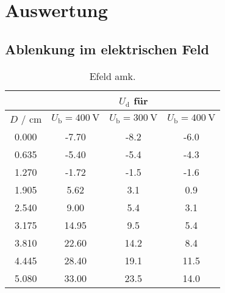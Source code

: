 \section{Auswertung}
\label{sec:Auswertung}

\subsection{Ablenkung im elektrischen Feld}

\begin{table}
	\caption{Efeld amk.}
	\label{tab:efeldtab}
	\centering
	\begin{tabular}{cccc}
	\toprule
		& & $U_{\mathrm{d}}$ für & \\
		\midrule
		$D$ / \si{\centi\meter} & $U_{\mathrm{b}}=\SI{400}{\volt}$ & $U_{\mathrm{b}}=\SI{300}{\volt}$ & $U_{\mathrm{b}}=\SI{400}{\volt}$ \\
		\midrule
		0.000 & -7.70 & -8.2 & -6.0 \\
		0.635 & -5.40 & -5.4 & -4.3 \\
		1.270 & -1.72 & -1.5 & -1.6 \\
		1.905 & 5.62 & 3.1 & 0.9 \\
		2.540 & 9.00 & 5.4 & 3.1 \\
		3.175 & 14.95 & 9.5 & 5.4 \\
		3.810 & 22.60 & 14.2 & 8.4 \\
		4.445 & 28.40 & 19.1 & 11.5 \\
		5.080 & 33.00 & 23.5 & 14.0 \\
	\bottomrule
	\end{tabular}
\end{table}



